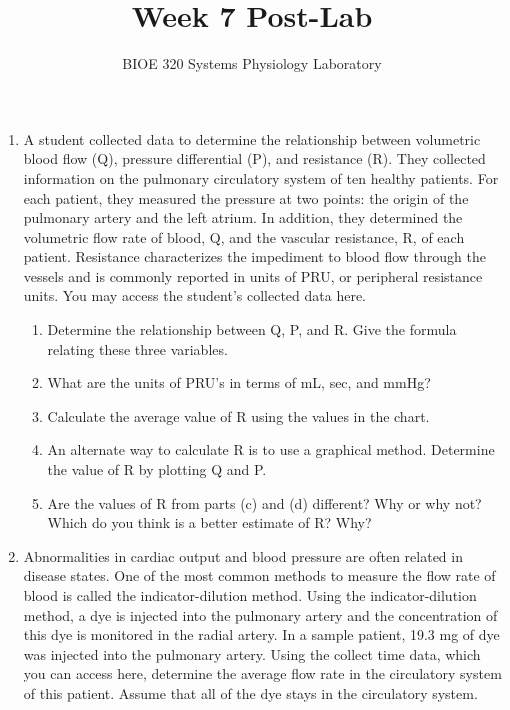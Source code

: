 \documentclass{article}
\title{Week 7 Post-Lab}
\author{BIOE 320 Systems Physiology Laboratory}
\date{}
\begin{document}
\maketitle
\large

\begin{enumerate}
	\item A student collected data to determine the relationship between volumetric blood flow (Q), pressure differential (\textDelta P), and resistance (R). They collected information on the pulmonary circulatory system of ten healthy patients. For each patient, they measured the pressure at two points: the origin of the pulmonary artery and the left atrium. In addition, they determined the volumetric flow rate of blood, Q, and the vascular resistance, R, of each patient. Resistance characterizes the impediment to blood flow through the vessels and is commonly reported in units of PRU, or peripheral resistance units. You may access the student's collected data here.
		\begin{enumerate}
			\item Determine the relationship between Q, \textDelta P, and R. Give the formula relating these three variables.
			\item What are the units of PRU's in terms of mL, sec, and mmHg?
			\item Calculate the average value of R using the values in the chart.
			\item An alternate way to calculate R is to use a graphical method. Determine the value of R by plotting Q and \textDelta P.
			\item Are the values of R from parts (c) and (d) different? Why or why not? Which do you think is a better estimate of R? Why?
		\end{enumerate}
	\item Abnormalities in cardiac output and blood pressure are often related in disease states. One of the most common methods to measure the flow rate of blood is called the indicator-dilution method. Using the indicator-dilution method, a dye is injected into the pulmonary artery and the concentration of this dye is monitored in the radial artery. In a sample patient, 19.3 mg of dye was injected into the pulmonary artery. Using the collect time data, which you can access here, determine the average flow rate in the circulatory system of this patient. Assume that all of the dye stays in the circulatory system.
\end{enumerate}
\end{document}
